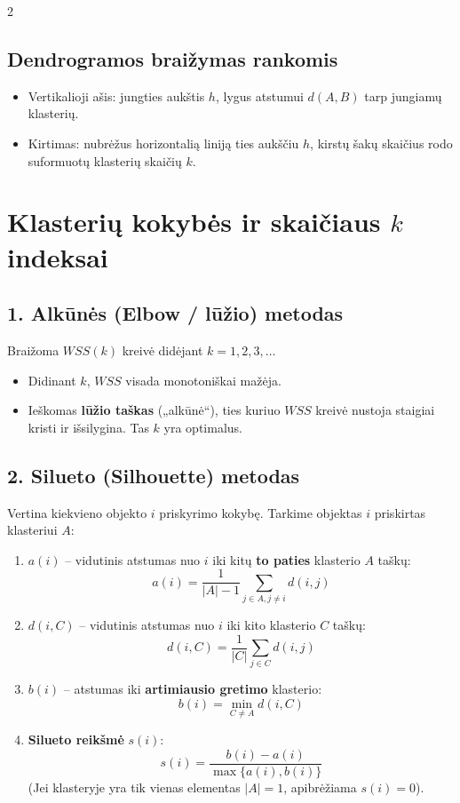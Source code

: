 \documentclass[9pt,a4paper]{article}
\begin{document}
\begin{multicols*}{2}
\subsection{Dendrogramos braižymas rankomis}
\begin{itemize}
    \item Vertikalioji ašis: jungties aukštis $h$, lygus atstumui $d(A, B)$ tarp jungiamų klasterių.
    \item Kirtimas: nubrėžus horizontalią liniją ties aukščiu $h$, kirstų šakų skaičius rodo suformuotų klasterių skaičių $k$.
\end{itemize}

\section{Klasterių kokybės ir skaičiaus $k$ indeksai}

\subsection{1. Alkūnės (Elbow / lūžio) metodas}
Braižoma $WSS(k)$ kreivė didėjant $k = 1, 2, 3, \dots$
\begin{itemize}
    \item Didinant $k$, $WSS$ visada monotoniškai mažėja.
    \item Ieškomas \textbf{lūžio taškas} („alkūnė“), ties kuriuo $WSS$ kreivė nustoja staigiai kristi ir išsilygina. Tas $k$ yra optimalus.
\end{itemize}

\subsection{2. Silueto (Silhouette) metodas}
Vertina kiekvieno objekto $i$ priskyrimo kokybę.
Tarkime objektas $i$ priskirtas klasteriui $A$:
\begin{enumerate}
    \item $a(i)$ -- vidutinis atstumas nuo $i$ iki kitų \textbf{to paties} klasterio $A$ taškų:
    \begin{equation*}
        a(i) = \frac{1}{|A| - 1}\sum_{j \in A, j \ne i} d(i, j)
    \end{equation*}
    \item $d(i, C)$ -- vidutinis atstumas nuo $i$ iki kito klasterio $C$ taškų:
    \begin{equation*}
        d(i, C) = \frac{1}{|C|}\sum_{j \in C} d(i, j)
    \end{equation*}
    \item $b(i)$ -- atstumas iki \textbf{artimiausio gretimo} klasterio:
    \begin{equation*}
        b(i) = \min_{C \ne A} d(i, C)
    \end{equation*}
    \item \textbf{Silueto reikšmė} $s(i)$:
    \begin{equation*}
        s(i) = \frac{b(i) - a(i)}{\max\{a(i), b(i)\}}
    \end{equation*}
    (Jei klasteryje yra tik vienas elementas $|A|=1$, apibrėžiama $s(i) = 0$).
\end{enumerate}


\end{multicols*}
\end{document}
